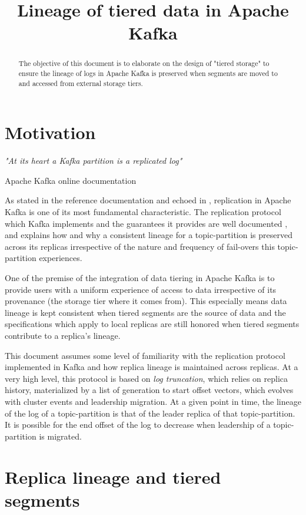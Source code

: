 \documentclass{article}
\title{Lineage of tiered data in Apache Kafka}
\begin{document}
\maketitle \thispagestyle{fancy2}
\begin{abstract}
	The objective of this document is to elaborate on the design of "tiered storage" to ensure the lineage of logs in Apache Kafka is preserved  when segments are moved to and accessed from external storage tiers.
\end{abstract}

\section{Motivation}
\epigraph{\textit{"At its heart a Kafka partition is a replicated log"}}{Apache Kafka online documentation \cite{RD1}}

As stated in the reference documentation and echoed in \cite{KDG}, replication in Apache Kafka is one of its most fundamental characteristic. The replication protocol which Kafka implements and the guarantees it provides are well documented \cite{KIP101} \cite{KIP279}, and explains how and why a consistent lineage for a topic-partition is preserved across its replicas irrespective of the nature and frequency of fail-overs this topic-partition experiences. 

One of the premise of the integration of data tiering in Apache Kafka is to provide users with a uniform experience of access to data irrespective of its provenance (the storage tier where it comes from). This especially means data lineage is kept consistent when tiered segments are the source of data and the specifications which apply to local replicas are still honored when tiered segments contribute to a replica's lineage.

This document assumes some level of familiarity with the replication protocol implemented in Kafka and how replica lineage is maintained across replicas. At a very high level, this protocol is based on \textit{log truncation}, which relies on replica history, materialized by a list of generation to start offset vectors, which evolves with cluster events and leadership migration. At a given point in time, the lineage of the log of a topic-partition is that of the leader replica of that topic-partition. It is possible for the end offset of the log to decrease when leadership of a topic-partition is migrated.

\section{Replica lineage and tiered segments}
\end{document}
